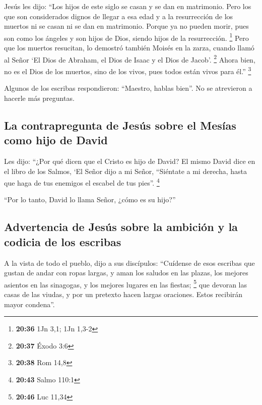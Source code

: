 Jesús les dijo: ``Los hijos de este siglo se casan y se
dan en matrimonio.  Pero los que son considerados dignos
de llegar a esa edad y a la resurrección de los muertos ni se casan ni
se dan en matrimonio.  Porque ya no pueden morir, pues
son como los ángeles y son hijos de Dios, siendo hijos de la
resurrección. \footnote{\textbf{20:36} 1Jn 3,1; 1Jn 1,3-2}
 Pero que los muertos resucitan, lo demostró también
Moisés en la zarza, cuando llamó al Señor `El Dios de Abraham, el Dios
de Isaac y el Dios de Jacob'. \footnote{\textbf{20:37} Éxodo 3:6}
 Ahora bien, no es el Dios de los muertos, sino de los
vivos, pues todos están vivos para él.'' \footnote{\textbf{20:38} Rom
  14,8}

 Algunos de los escribas respondieron: ``Maestro, hablas
bien''.  No se atrevieron a hacerle más preguntas.

\hypertarget{la-contrapregunta-de-jesuxfas-sobre-el-mesuxedas-como-hijo-de-david}{%
\subsection{La contrapregunta de Jesús sobre el Mesías como hijo de
David}\label{la-contrapregunta-de-jesuxfas-sobre-el-mesuxedas-como-hijo-de-david}}

 Les dijo: ``¿Por qué dicen que el Cristo es hijo de
David?  El mismo David dice en el libro de los Salmos,
`El Señor dijo a mi Señor, ``Siéntate a mi derecha, 
hasta que haga de tus enemigos el escabel de tus pies''. \footnote{\textbf{20:43}
  Salmo 110:1}

 ``Por lo tanto, David lo llama Señor, ¿cómo es su
hijo?''

\hypertarget{advertencia-de-jesuxfas-sobre-la-ambiciuxf3n-y-la-codicia-de-los-escribas}{%
\subsection{Advertencia de Jesús sobre la ambición y la codicia de los
escribas}\label{advertencia-de-jesuxfas-sobre-la-ambiciuxf3n-y-la-codicia-de-los-escribas}}

 A la vista de todo el pueblo, dijo a sus discípulos:
 ``Cuídense de esos escribas que gustan de andar con
ropas largas, y aman los saludos en las plazas, los mejores asientos en
las sinagogas, y los mejores lugares en las fiestas; \footnote{\textbf{20:46}
  Luc 11,34}  que devoran las casas de las viudas, y por
un pretexto hacen largas oraciones. Estos recibirán mayor condena''.

